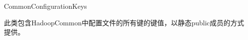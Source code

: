 \begin{XeClass}{CommonConfigurationKeys}
   
 此类包含HadoopCommon中配置文件的所有键的键值，以静态public成员的方式提供。

\end{XeClass}
